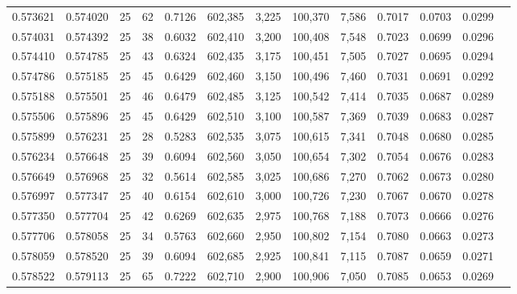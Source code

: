 \begin{tabular}{rrrrrrrrrrrrr}
0.573621 & 0.574020 &    25 &  62 &                                     0.7126 & 602,385 &   3,225 & 100,370 &   7,586 & 0.7017 & 0.0703 & 0.0299 \\
0.574031 & 0.574392 &    25 &  38 &                                     0.6032 & 602,410 &   3,200 & 100,408 &   7,548 & 0.7023 & 0.0699 & 0.0296 \\
0.574410 & 0.574785 &    25 &  43 &                                     0.6324 & 602,435 &   3,175 & 100,451 &   7,505 & 0.7027 & 0.0695 & 0.0294 \\
0.574786 & 0.575185 &    25 &  45 &                                     0.6429 & 602,460 &   3,150 & 100,496 &   7,460 & 0.7031 & 0.0691 & 0.0292 \\
0.575188 & 0.575501 &    25 &  46 &                                     0.6479 & 602,485 &   3,125 & 100,542 &   7,414 & 0.7035 & 0.0687 & 0.0289 \\
0.575506 & 0.575896 &    25 &  45 &                                     0.6429 & 602,510 &   3,100 & 100,587 &   7,369 & 0.7039 & 0.0683 & 0.0287 \\
0.575899 & 0.576231 &    25 &  28 &                                     0.5283 & 602,535 &   3,075 & 100,615 &   7,341 & 0.7048 & 0.0680 & 0.0285 \\
0.576234 & 0.576648 &    25 &  39 &                                     0.6094 & 602,560 &   3,050 & 100,654 &   7,302 & 0.7054 & 0.0676 & 0.0283 \\
0.576649 & 0.576968 &    25 &  32 &                                     0.5614 & 602,585 &   3,025 & 100,686 &   7,270 & 0.7062 & 0.0673 & 0.0280 \\
0.576997 & 0.577347 &    25 &  40 &                                     0.6154 & 602,610 &   3,000 & 100,726 &   7,230 & 0.7067 & 0.0670 & 0.0278 \\
0.577350 & 0.577704 &    25 &  42 &                                     0.6269 & 602,635 &   2,975 & 100,768 &   7,188 & 0.7073 & 0.0666 & 0.0276 \\
0.577706 & 0.578058 &    25 &  34 &                                     0.5763 & 602,660 &   2,950 & 100,802 &   7,154 & 0.7080 & 0.0663 & 0.0273 \\
0.578059 & 0.578520 &    25 &  39 &                                     0.6094 & 602,685 &   2,925 & 100,841 &   7,115 & 0.7087 & 0.0659 & 0.0271 \\
0.578522 & 0.579113 &    25 &  65 &                                     0.7222 & 602,710 &   2,900 & 100,906 &   7,050 & 0.7085 & 0.0653 & 0.0269 \\

\end{tabular}

